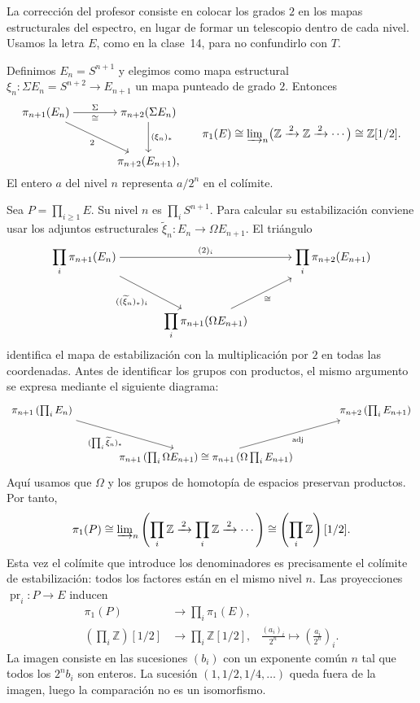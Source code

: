 La corrección del profesor consiste en colocar los grados $2$ en los mapas estructurales del espectro, en lugar de formar un telescopio dentro de cada nivel. Usamos la letra $E$, como en la clase~14, para no confundirlo con $T$.

\begin{ejem}
Definimos $E_n=S^{n+1}$ y elegimos como mapa estructural $\xi_n\colon\Sigma E_n=S^{n+2}\to E_{n+1}$ un mapa punteado de grado $2$. Entonces
\[
\begin{tikzcd}[cramped,column sep=large,row sep=large]
\pi_{n+1}(E_n) \arrow[r,"\Sigma","\cong"'] \arrow[dr,"2"']
& \pi_{n+2}(\Sigma E_n) \arrow[d,"(\xi_n)_*"]\\
& \pi_{n+2}(E_{n+1}),
\end{tikzcd}
\qquad
\pi_1(E)\cong\varinjlim\nolimits_n\bigl(\mathbb Z\xrightarrow{\,2\,}\mathbb Z\xrightarrow{\,2\,}\cdots\bigr)
\cong\mathbb Z[1/2].
\]
El entero $a$ del nivel $n$ representa $a/2^n$ en el colímite.

Sea $P=\prod_{i\ge1}E$. Su nivel $n$ es $\prod_iS^{n+1}$. Para calcular su estabilización conviene usar los adjuntos estructurales $\widetilde\xi_n\colon E_n\to\Omega E_{n+1}$. El triángulo
\[
\begin{tikzcd}[cramped,column sep=large,row sep=large]
\displaystyle\prod_i\pi_{n+1}(E_n)
\arrow[rr,"(2)_i"] \arrow[dr,"((\widetilde\xi_n)_*)_i"']
&& \displaystyle\prod_i\pi_{n+2}(E_{n+1})\\
& \displaystyle\prod_i\pi_{n+1}(\Omega E_{n+1})
\arrow[ur,"\cong"'] &
\end{tikzcd}
\]
identifica el mapa de estabilización con la multiplicación por $2$ en todas las coordenadas. Antes de identificar los grupos con productos, el mismo argumento se expresa mediante el siguiente diagrama:
\[
\begin{tikzcd}[column sep=large,row sep=large]
\pi_{n+1}\left(\prod_iE_n\right) \arrow[dr,"(\prod_i\widetilde\xi_n)_*"']
&& \pi_{n+2}\left(\prod_iE_{n+1}\right)\\
& \pi_{n+1}\left(\prod_i\Omega E_{n+1}\right)\cong\pi_{n+1}\left(\Omega\prod_iE_{n+1}\right)
\arrow[ur,"\mathrm{adj}"'] &
\end{tikzcd}
\]
Aquí usamos que $\Omega$ y los grupos de homotopía de espacios preservan productos. Por tanto,
\[
\pi_1(P)\cong\varinjlim\nolimits_n\left(\prod_i\mathbb Z\xrightarrow{\,2\,}\prod_i\mathbb Z\xrightarrow{\,2\,}\cdots\right)
\cong\left(\prod_i\mathbb Z\right)[1/2].
\]
Esta vez el colímite que introduce los denominadores es precisamente el colímite de estabilización: todos los factores están en el mismo nivel $n$. Las proyecciones $\operatorname{pr}_i\colon P\to E$ inducen
\[
\begin{aligned}
\pi_1(P)&\longrightarrow\prod_i\pi_1(E),\\
\left(\prod_i\mathbb Z\right)[1/2]&\longrightarrow\prod_i\mathbb Z[1/2],
&\frac{(a_i)_i}{2^n}\longmapsto\left(\frac{a_i}{2^n}\right)_i.
\end{aligned}
\]
La imagen consiste en las sucesiones $(b_i)$ con un exponente común $n$ tal que todos los $2^nb_i$ son enteros. La sucesión $(1,1/2,1/4,\ldots)$ queda fuera de la imagen, luego la comparación no es un isomorfismo.


\end{ejem}
